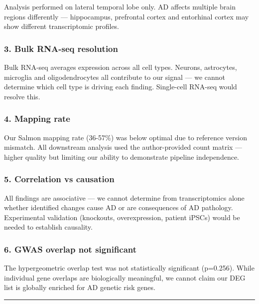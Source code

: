 \documentclass[
]{article}
\begin{document}
Analysis performed on lateral temporal lobe only. AD affects multiple
brain regions differently --- hippocampus, prefrontal cortex and
entorhinal cortex may show different transcriptomic profiles.

\subsubsection{3. Bulk RNA-seq
resolution}\label{bulk-rna-seq-resolution}

Bulk RNA-seq averages expression across all cell types. Neurons,
astrocytes, microglia and oligodendrocytes all contribute to our signal
--- we cannot determine which cell type is driving each finding.
Single-cell RNA-seq would resolve this.

\subsubsection{4. Mapping rate}\label{mapping-rate}

Our Salmon mapping rate (36-57\%) was below optimal due to reference
version mismatch. All downstream analysis used the author-provided count
matrix --- higher quality but limiting our ability to demonstrate
pipeline independence.

\subsubsection{5. Correlation vs
causation}\label{correlation-vs-causation}

All findings are associative --- we cannot determine from
transcriptomics alone whether identified changes cause AD or are
consequences of AD pathology. Experimental validation (knockouts,
overexpression, patient iPSCs) would be needed to establish causality.

\subsubsection{6. GWAS overlap not
significant}\label{gwas-overlap-not-significant}

The hypergeometric overlap test was not statistically significant
(p=0.256). While individual gene overlaps are biologically meaningful,
we cannot claim our DEG list is globally enriched for AD genetic risk
genes.

\begin{center}\rule{0.5\linewidth}{0.5pt}\end{center}
\end{document}
